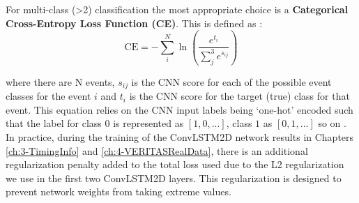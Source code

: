 For multi-class (>2) classification the most appropriate choice is a \textbf{Categorical Cross-Entropy Loss Function (CE)}. This is defined \cite{Keras} as :
\begin{equation}
    \textrm{CE}=-\sum_i^N \ln \left( \frac{e^{t_{i}}}{\sum_j^3 e^{s_{ij}}} \right)
\end{equation}

where there are N events, $s_{ij}$  is the CNN score for each of the possible event classes for the event $i$ and $t_{i}$ is the CNN score for the target (true) class for that event. This equation relies on the CNN input labels being `one-hot' encoded such that the label for class $0$ is represented as $[1,0,...]$, class $1$ as $[0,1,...]$ so on \cite{fb}. In practice, during the training of the ConvLSTM2D network results in Chapters \ref{ch:3-TimingInfo} and \ref{ch:4-VERITASRealData}, there is an additional regularization penalty added to the total loss used due to the L2 regularization we use in the first two ConvLSTM2D layers. This regularization is designed to prevent network weights from taking extreme values.

\begin{table}[ht]
    \centering
    \caption{Definitions of Event Classifications for binary classification, taken from \cite{fawcett}.}
    \label{table:FPR}
\end{table}

